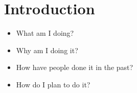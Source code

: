 \section{Introduction}\label{sec:intro}

\begin{itemize}
    \item What am I doing?
    \item Why am I doing it?
    \item How have people done it in the past?
    \item How do I plan to do it?
\end{itemize}
